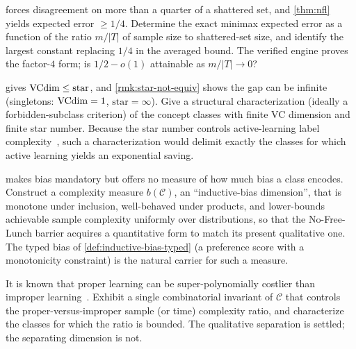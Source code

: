 \begin{openprob}
\label{op:nfl-constant}
 forces disagreement on more than a quarter of a shattered set, and \cref{thm:nfl} yields expected error $\geq 1/4$. Determine the exact minimax expected error as a function of the ratio $m/|T|$ of sample size to shattered-set size, and identify the largest constant replacing $1/4$ in the averaged bound. The verified engine proves the factor-$4$ form; is $1/2 - o(1)$ attainable as $m/|T| \to 0$?
\end{openprob}

\begin{openprob}
\label{op:star}
 gives $\mathrm{VCdim} \leq \mathrm{star}$, and \cref{rmk:star-not-equiv} shows the gap can be infinite (singletons: $\mathrm{VCdim} = 1$, $\mathrm{star} = \infty$). Give a structural characterization (ideally a forbidden-subclass criterion) of the concept classes with finite VC dimension and finite star number. Because the star number controls active-learning label complexity~\cite{HannekeYang2015}, such a characterization would delimit exactly the classes for which active learning yields an exponential saving.
\end{openprob}

\begin{openprob}
\label{op:bias-dimension}
 makes bias mandatory but offers no measure of how much bias a class encodes. Construct a complexity measure $b(\mathcal{C})$, an ``inductive-bias dimension'', that is monotone under inclusion, well-behaved under products, and lower-bounds achievable sample complexity uniformly over distributions, so that the No-Free-Lunch barrier acquires a quantitative form to match its present qualitative one. The typed bias of \cref{def:inductive-bias-typed} (a preference score with a monotonicity constraint) is the natural carrier for such a measure.
\end{openprob}

\begin{openprob}
\label{op:proper-improper}
It is known that proper learning can be super-polynomially costlier than improper learning~\cite{PittValiant1988}. Exhibit a single combinatorial invariant of $\mathcal{C}$ that controls the proper-versus-improper sample (or time) complexity ratio, and characterize the classes for which the ratio is bounded. The qualitative separation is settled; the separating dimension is not.
\end{openprob}


